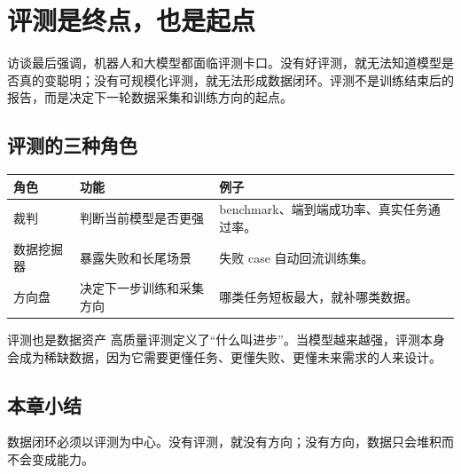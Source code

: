 \section{评测是终点，也是起点}

访谈最后强调，机器人和大模型都面临评测卡口。没有好评测，就无法知道模型是否真的变聪明；没有可规模化评测，就无法形成数据闭环。评测不是训练结束后的报告，而是决定下一轮数据采集和训练方向的起点。

\subsection{评测的三种角色}

\noindent\begin{longtable}{p{}p{}p{}}
\toprule
角色 & 功能 & 例子 \\
\midrule
裁判 & 判断当前模型是否更强 & benchmark、端到端成功率、真实任务通过率。 \\
数据挖掘器 & 暴露失败和长尾场景 & 失败 case 自动回流训练集。 \\
方向盘 & 决定下一步训练和采集方向 & 哪类任务短板最大，就补哪类数据。 \\
\bottomrule
\end{longtable}

\begin{importantbox}{评测也是数据资产}
高质量评测定义了“什么叫进步”。当模型越来越强，评测本身会成为稀缺数据，因为它需要更懂任务、更懂失败、更懂未来需求的人来设计。
\end{importantbox}

\subsection{本章小结}

数据闭环必须以评测为中心。没有评测，就没有方向；没有方向，数据只会堆积而不会变成能力。

